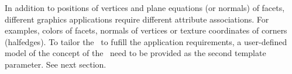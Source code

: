 In addition to positions of vertices and plane equations (or normals) 
of facets, different graphics applications require different
attribute associations. For examples, colors of facets, normals of 
vertices or texture coordinates of corners (halfedges). To tailor
the \poly\ to fufill the application requirements, a user-defined
model of the concept of the \polyitem\ need to be provided as the 
second template parameter. See next section.
